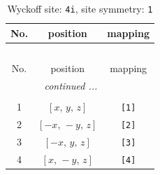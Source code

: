 \documentclass[fleqn,8pt]{jsarticle}
\begin{document}
\begin{longtable}{ccc}
\caption{Wyckoff site: {\tt 4i}, site symmetry: {\tt 1}}
 \\
 \hline \hline
No. & position & mapping \\ \hline \endfirsthead

\multicolumn{2}{l}{\tablename\ \thetable{}} \\
 \hline \hline
No. & position & mapping \\ \hline \endhead

 \hline \hline
\multicolumn{2}{r}{\footnotesize\it continued ...} \\ \endfoot

 \hline \hline
\multicolumn{2}{r}{} \\ \endlastfoot

1 & $\left[ x,\, y,\, z \right]$ & {\tt [1]} \\ \hline
2 & $\left[ - x,\, - y,\, z \right]$ & {\tt [2]} \\ \hline
3 & $\left[ - x,\, y,\, z \right]$ & {\tt [3]} \\ \hline
4 & $\left[ x,\, - y,\, z \right]$ & {\tt [4]} \\
\end{longtable}
\end{document}
